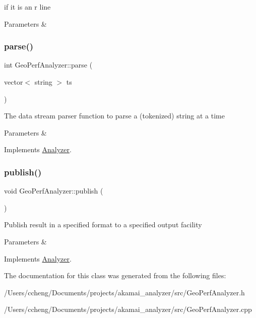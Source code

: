 if it is an r line


\begin{DoxyParams}{Parameters}
{\em } & \\
\hline
\end{DoxyParams}
\mbox{\label{class_geo_perf_analyzer_a03fcf5846ad4963692df9367e65469df}} 
\subsubsection{\texorpdfstring{parse()}{parse()}}
{\footnotesize\ttfamily int Geo\+Perf\+Analyzer\+::parse (\begin{DoxyParamCaption}\item[{vector$<$ string $>$}]{ts }\end{DoxyParamCaption})\hspace{0.3cm}{\ttfamily [virtual]}}

The data stream parser function to parse a (tokenized) string at a time


\begin{DoxyParams}{Parameters}
{\em } & \\
\hline
\end{DoxyParams}


Implements \mbox{\hyperlink{class_analyzer}{Analyzer}}.

\mbox{\label{class_geo_perf_analyzer_af79f2adf101667172fd4b6c42459003c}} 
\subsubsection{\texorpdfstring{publish()}{publish()}}
{\footnotesize\ttfamily void Geo\+Perf\+Analyzer\+::publish (\begin{DoxyParamCaption}{ }\end{DoxyParamCaption})\hspace{0.3cm}{\ttfamily [virtual]}}

Publish result in a specified format to a specified output facility


\begin{DoxyParams}{Parameters}
{\em } & \\
\hline
\end{DoxyParams}


Implements \mbox{\hyperlink{class_analyzer}{Analyzer}}.



The documentation for this class was generated from the following files\+:\begin{DoxyCompactItemize}
\item 
/\+Users/ccheng/\+Documents/projects/akamai\+\_\+analyzer/src/Geo\+Perf\+Analyzer.\+h\item 
/\+Users/ccheng/\+Documents/projects/akamai\+\_\+analyzer/src/Geo\+Perf\+Analyzer.\+cpp\end{DoxyCompactItemize}
